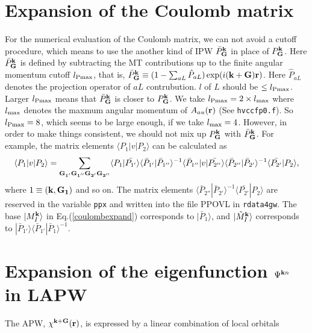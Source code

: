 \documentclass[a4paper,10pt,epsf,fleqn]{article}
\begin{document}
{{{\begin{thebibliography}{00}
\section{Expansion of the Coulomb matrix}
For the numerical evaluation of the Coulomb matrix,
we can not avoid a cutoff procedure, which means to use
the another kind of IPW $\bar{P}^{\bf k}_{{\bf G}}$
in place of $P^{\bf k}_{{\bf G}}$.
Here $\bar{P}^{\bf k}_{{\bf G}}$ is defined by subtracting
the MT contributions up to the finite angular momentum cutoff $l_{\rm Pmax}$,
that is, $\bar{P}^{\bf k}_{{\bf G}} \equiv 
( 1- \sum_{aL} \hat{P}_{aL} ) \exp(i ({\bf k+ G}){\bf r}) $.
Here $\hat{P}_{aL}$ denotes the projection operator of ${aL}$ contrubution.
$l$ of $L$ should be $\le l_{\rm Pmax}$.
Larger $l_{\rm Pmax}$ means that
$\bar{P}^{\bf k}_{{\bf G}}$ is closer to ${P}^{\bf k}_{{\bf G}}$.
We take $l_{\rm Pmax} = 2 \times l_{\rm max}$ where $l_{\rm max}$
denotes the maxmum angular momentum of $A_{au}({\bf r})$ 
(See {\tt hvccfp0.f}). So $l_{\rm Pmax}=8$, which seems to be large enough, 
if we take $l_{\rm max}=4$. However, in order to make things consistent,
we should not mix up $P^{\bf k}_{{\bf G}}$ 
with $\bar{P}^{\bf k}_{{\bf G}}$.
For example, the matrix elements $\langle P_1 |v| P_2 \rangle$ 
can be calculated as
\begin{eqnarray}
\langle P_1 |v| P_2 \rangle = \sum_{\bf G_{1'} G_{1''} G_{2'} G_{2''}} 
\langle P_1 | \bar{P_{1'}} \rangle  
\langle \bar{P}_{1'}| \bar{P}_{1''} \rangle^{-1} 
\langle \bar{P}_{1''} |v| \bar{P_{2''}} \rangle  
\langle \bar{P}_{2''}| \bar{P}_{2'} \rangle^{-1} 
\langle \bar{P_{2'}} | P_2 \rangle,  
\end{eqnarray}
where $1\equiv ({\bf k},{\bf G_1})$ and so on.
The matrix elements
$\langle \bar{P}_{2''}| \bar{P}_{2'} \rangle^{-1} 
\langle \bar{P_{2'}} | P_2 \rangle$
are reserved in the variable {\tt ppx} and written into the file
{\sf PPOVL} in {\tt rdata4gw}.
The base $|M^{\bf k}_I \rangle$ in Eq.(\ref{coulombexpand}) corresponds to $|\bar{P}_1 \rangle$,
and $|\tilde{M}^{\bf k}_I \rangle$ corresponds to
$| \bar{P}_{1'} \rangle \langle \bar{P}_{1'}| \bar{P}_{1} \rangle^{-1}$.



\section{Expansion of the eigenfunction $\Psi^{{\bf k}n}$ in LAPW}
The APW, $\chi^{{\bf k+G}}({\bf r})$, is 
expressed by a linear combination of local orbitals


\end{thebibliography}}}}
\end{document}
